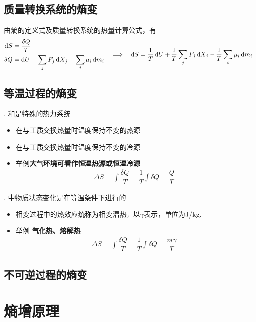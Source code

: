 \subsection{质量转换系统的熵变}
由熵的定义式及质量转换系统的热量计算公式，有
\begin{align}
	\begin{aligned}
		{\rm{d}} S &=\dfrac{\delta Q}{T}\\
		\delta Q &= {\rm{d}} U + \sum_j F_j\,{\rm{d}} X_j - \sum_i \mu_i \, {\rm{d}} m_i
	\end{aligned}
\quad \Longrightarrow \quad 
{\rm{d}} S = \dfrac{1}{T} \,{\rm{d}} U + \dfrac{1}{T} \sum_j F_j\,{\rm{d}} X_j - \dfrac{1}{T} \sum_i \mu_i \, {\rm{d}} m_i
\end{align}

\subsection{等温过程的熵变}
. 和是特殊的热力系统
\begin{itemize}
	\item {} \quad 在与工质交换热量时温度保持不变的热源
	\item {}\quad 在与工质交换热量时温度保持不变的冷源
	\item 举例\quad \textbf{大气环境可看作恒温热源或恒温冷源}
	\begin{align}
		\Delta S = \int \dfrac{\delta Q}{T} = \dfrac{1}{T} \int \delta Q = \dfrac{Q}{T}
	\end{align}
\end{itemize}

. 中物质状态变化是在等温条件下进行的
\begin{itemize}
	\item 相变过程中的热效应统称为相变潜热，以$\gamma$表示，单位为J/kg.
	\item 举例 \quad \textbf{气化热、熔解热}
	\begin{align}
		\Delta S = \int \dfrac{\delta Q}{T} = \dfrac{1}{T} \int \delta Q = \dfrac{m \gamma}{T}
	\end{align}
\end{itemize}

\subsection{不可逆过程的熵变}
\section{熵增原理}

